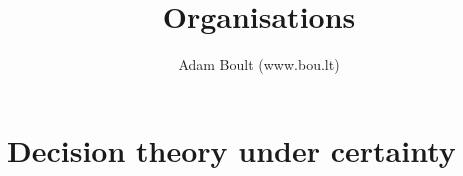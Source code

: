 \documentclass[oneside]{book}
\begin{document}
\author{Adam Boult (www.bou.lt)}
\title{Organisations}
\maketitle

\setcounter{tocdepth}{0}
\tableofcontents



\part{Decision theory under certainty}

\end{document}
